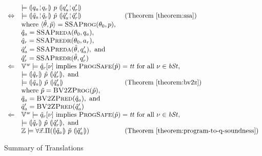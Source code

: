 \begin{figure}
\[
  \begin{array}{cll}
    & \models \hoaretriple{q_a \andar q_r}{p}{q_a' \andar q_r'}\\
    \Leftrightarrow
    & \models
      \hoaretriple{\hat{q}_a \andar \hat{q}_r}
      {\hat{p}}
      {\hat{q}_a' \andar \hat{q}_r'}
    & \textmd{ (Theorem~\ref{theorem:ssa})}\\
    &
      \textmd{where } \langle \hat{\theta}, \hat{p} \rangle =
      \textsc{SSAProg} (\theta_0, p), \\
    & \hat{q}_a = \textsc{SSAPreda}(\theta_0, q_a), \\
    & \hat{q}_r = \textsc{SSAPredr}(\theta_0, a_r), \\
    & \hat{q}_a' = \textsc{SSAPreda}(\hat{\theta}, q_a'), \textmd{ and} \\
    & \hat{q}_r' = \textsc{SSAPredr}(\hat{\theta}, q_r') \\
    \Leftarrow
    & \multicolumn{2}{l}{\BV^\wordsize \models \hat{q}_r[\bvst] \textmd{ implies } \textsc{ProgSafe}(\hat{p}) = \btt \textmd{ for all } \bvst \in \bvSt,} \\
    & \models \hoaretriple{\hat{q}_r}{\hat{p}}{\hat{q}_r'}, \textmd{ and } \\
    & \models \hoaretriple{\tilde{q}_a}{\tilde{p}}{\tilde{q}_a'}
    & \textmd{ (Theorem~\ref{theorem:bv2z})} \\
    & \textmd{where } \tilde{p} = \textsc{BV2ZProg}(\hat{p}), \\
    & \tilde{q}_a = \textsc{BV2ZPred}(\hat{q}_a), \textmd{ and} \\
    & \tilde{q}_a' = \textsc{BV2ZPred}(\hat{q}_a') \\
    \Leftarrow
    & \multicolumn{2}{l}{\BV^\wordsize \models \hat{q}_r[\bvst] \textmd{ implies } \textsc{ProgSafe}(\hat{p}) = \btt \textmd{ for all } \bvst \in \bvSt,} \\
    & \models \hoaretriple{\hat{q}_r}{\hat{p}}{\hat{q}_r'}, \textmd{ and } \\
    & \bbfZ \models \forall \vx.
      \Pi (\hoaretriple{\tilde{q}_a}{\tilde{p}}{\tilde{q}_a'})
    & \textmd{ (Theorem~\ref{theorem:program-to-q-soundness})}
  \end{array}
\]
  \caption{Summary of Translations}
  \label{fig:summary}
\end{figure}

